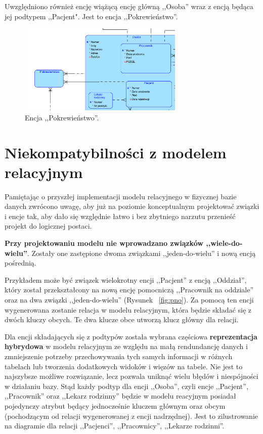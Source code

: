 Uwzględniono również encję wiążącą encję główną ,,Osoba'' wraz z encją będąca jej podtypem ,,Pacjent". Jest to encja ,,Pokrewieństwo''.

\begin{figure}[H]
\centering
\includegraphics[width=0.7\textwidth]{img/pokrewienstwo.png}
\caption{\small Encja ,,Pokrewieństwo''.}
\end{figure}

\section{Niekompatybilności z modelem relacyjnym}
Pamiętając o przyszłej implementacji modelu relacyjnego w fizycznej bazie danych zwrócono uwagę, aby już na poziomie konceptualnym projektować związki i encje tak, aby dało się względnie łatwo i bez zbytniego narzutu przenieść projekt do logicznej postaci.

\textbf{Przy projektowaniu modelu nie wprowadzano związków ,,wiele-do-wielu''}. Zostały one zastępione dwoma związkami ,,jeden-do-wielu'' i nową encją pośrednią. 

Przykładem może być związek wielokrotny encji ,,Pacjent'' z encją ,,Oddział'', który został przekształcony na nową encję pomocniczą ,,Pracownik na oddziale'' oraz na dwa związki ,,jeden-do-wielu'' (Rysunek ~\ref{fig:pno}). Za pomocą ten encji wygenerowana zostanie relacja w modelu relacyjnym, która będzie składać się z dwóch kluczy obcych. Te dwa klucze obce utworzą klucz główny dla relacji.

Dla encji składających się z podtypów została wybrana częściowa \textbf{reprezentacja hybrydowa} w modelu relacyjnym ze względu na małą rendundancję danych i zmniejszenie potrzeby przechowywania tych samych informacji w różnych tabelach lub tworzenia dodatkowych widoków i więzów na tabele. Nie jest to najszybsze możliwe rozwiązanie, lecz pozwala uniknąć wielu błędów i niespójności w działaniu bazy. Stąd każdy podtyp dla encji ,,Osoba'', czyli encje ,,Pacjent'', ,,Pracownik'' oraz ,,Lekarz rodzinny'' będzie w modelu reacyjnym posiadał pojedynczy atrybut będący jednocześnie kluczem głównym oraz obcym (pochodzącym od relacji wygenerowanej z encji nadrzędnej). Jest to zilustrowanie na diagramie dla relacji ,,Pacjenci'', ,,Pracownicy'', ,,Lekarze rodzinni''.

